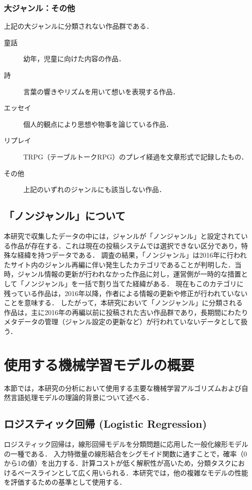 \documentclass[uplatex, dvipdfmx, 11pt, a4paper, report]{jsbook}
\begin{document}
\subsubsection*{大ジャンル：その他}
上記の大ジャンルに分類されない作品群である．
\begin{description}
    \item[童話] 幼年，児童に向けた内容の作品．
    \item[詩] 言葉の響きやリズムを用いて想いを表現する作品．
    \item[エッセイ] 個人的観点により思想や物事を論じている作品．
    \item[リプレイ] TRPG（テーブルトークRPG）のプレイ経過を文章形式で記録したもの．
    \item[その他] 上記のいずれのジャンルにも該当しない作品．
\end{description}

\subsection{「ノンジャンル」について}
本研究で収集したデータの中には，ジャンルが「ノンジャンル」と設定されている作品が存在する．これは現在の投稿システムでは選択できない区分であり，特殊な経緯を持つデータである．
調査の結果，「ノンジャンル」は2016年に行われたサイト内のジャンル再編に伴い発生したカテゴリであることが判明した．当時，ジャンル情報の更新が行われなかった作品に対し，運営側が一時的な措置として「ノンジャンル」を一括で割り当てた経緯がある．
現在もこのカテゴリに残っている作品は，2016年以降，作者による情報の更新や修正が行われていないことを意味する．
したがって，本研究において「ノンジャンル」に分類される作品は，主に2016年の再編以前に投稿された古い作品群であり，長期間にわたりメタデータの管理（ジャンル設定の更新など）が行われていないデータとして扱う．

\section{使用する機械学習モデルの概要}
本節では，本研究の分析において使用する主要な機械学習アルゴリズムおよび自然言語処理モデルの理論的背景について述べる．

\subsection{ロジスティック回帰 (Logistic Regression)}
ロジスティック回帰は，線形回帰モデルを分類問題に応用した一般化線形モデルの一種である．
入力特徴量の線形結合をシグモイド関数に通すことで，確率（0から1の値）を出力する．計算コストが低く解釈性が高いため，分類タスクにおけるベースラインとして広く用いられる．本研究では，他の複雑なモデルの性能を評価するための基準として使用する．
\end{document}
